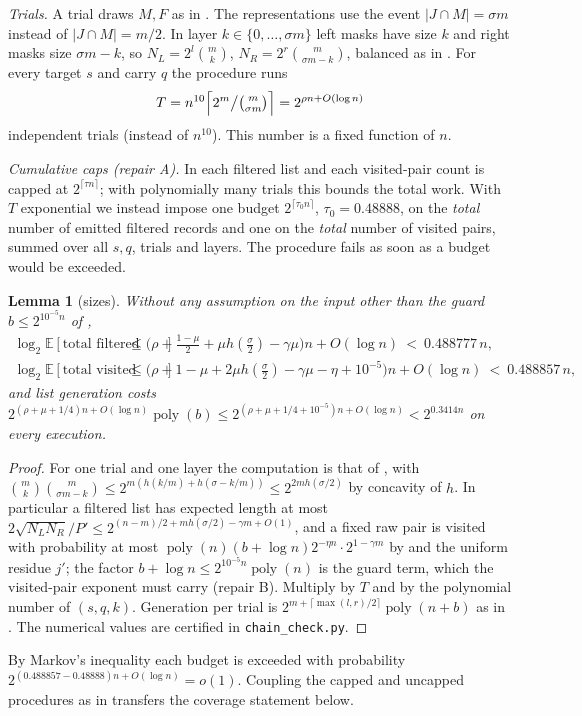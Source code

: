 \documentclass[11pt]{amsart}
\newtheorem{lemma}[theorem]{Lemma}
\theoremstyle{remark}
\newcommand{\E}{\mathbb E}
\begin{document}
\smallskip\noindent\emph{Trials.} A trial draws $M,F$ as in \cite{oai}. The representations use the
event $|J\cap M|=\sigma m$ instead of $|J\cap M|=m/2$. In layer $k\in\{0,\dots,\sigma m\}$ left masks
have size $k$ and right masks size $\sigma m-k$, so $N_L=2^l\binom mk$, $N_R=2^r\binom m{\sigma m-k}$,
balanced as in \cite[(5.6)]{oai}. For every target $s$ and carry $q$ the procedure runs
\[
T=n^{10}\Bigl\lceil 2^m\big/\tbinom m{\sigma m}\Bigr\rceil=2^{\rho n+O(\log n)}
\]
independent trials (instead of $n^{10}$). This number is a fixed function of $n$.

\smallskip\noindent\emph{Cumulative caps (repair A).} In \cite{oai} each filtered list and each
visited-pair count is capped at $2^{\lceil\tau n\rceil}$; with polynomially many trials this bounds the
total work. With $T$ exponential we instead impose one budget $2^{\lceil\tau_0n\rceil}$,
$\tau_0=0.48888$, on the \emph{total} number of emitted filtered records and one on the \emph{total}
number of visited pairs, summed over all $s,q$, trials and layers. The procedure fails as soon as a
budget would be exceeded.

\begin{lemma}[sizes]\label{lem:sizes}
Without any assumption on the input other than the guard $b\le2^{10^{-5}n}$ of \cite[(5.1)]{oai},
\begin{align*}
\log_2\E[\text{total filtered records}]&\le\bigl(\rho+\tfrac{1-\mu}2+\mu h(\tfrac\sigma2)-\gamma\mu\bigr)n+O(\log n)
\ <\ 0.488777\,n,\\
\log_2\E[\text{total visited pairs}]&\le\bigl(\rho+1-\mu+2\mu h(\tfrac\sigma2)-\gamma\mu-\eta+10^{-5}\bigr)n+O(\log n)
\ <\ 0.488857\,n,
\end{align*}
and list generation costs $2^{(\rho+\mu+1/4)n+O(\log n)}\operatorname{poly}(b)\le2^{(\rho+\mu+1/4+10^{-5})n+O(\log n)}<2^{0.3414n}$ on every execution.
\end{lemma}
\begin{proof}
For one trial and one layer the computation is that of \cite[(5.8), (5.11)]{oai}, with
$\binom mk\binom m{\sigma m-k}\le2^{m(h(k/m)+h(\sigma-k/m))}\le2^{2mh(\sigma/2)}$ by concavity of $h$.
In particular a filtered list has expected length at most
$2\sqrt{N_LN_R}/P'\le2^{(n-m)/2+mh(\sigma/2)-\gamma m+O(1)}$, and a fixed raw pair is visited with
probability at most $\operatorname{poly}(n)(b+\log n)2^{-\eta n}\cdot2^{1-\gamma m}$ by
\cite[Lemma~2.5]{oai} and the uniform residue $j'$; the factor $b+\log n\le2^{10^{-5}n}\operatorname{poly}(n)$ is the
guard term, which the visited-pair exponent must carry (repair B). Multiply by $T$ and by the
polynomial number of $(s,q,k)$. Generation per trial is $2^{m+\lceil\max(l,r)/2\rceil}\operatorname{poly}(n+b)$ as in
\cite[(5.7)]{oai}. The numerical values are certified in \texttt{chain\_check.py}.
\end{proof}
By Markov's inequality each budget is exceeded with probability
$2^{(0.488857-0.48888)n+O(\log n)}=o(1)$. Coupling the capped and uncapped procedures as in
\cite[end of Section~5]{oai} transfers the coverage statement below.
\end{document}
